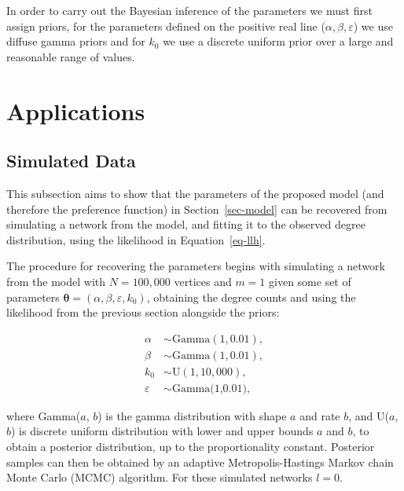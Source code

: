 \documentclass[
  sn-basic,
  10pt,
]{sn-jnl}
\theoremstyle{thmstyleone}
\theoremstyle{thmstyleone}
\theoremstyle{remark}
\theoremstyle{plain}
\theoremstyle{plain}
\theoremstyle{remark}
\begin{document}
In order to carry out the Bayesian inference of the parameters we must
first assign priors, for the parameters defined on the positive real
line (\(\alpha, \beta,\varepsilon\)) we use diffuse gamma priors and for
\(k_0\) we use a discrete uniform prior over a large and reasonable
range of values.

\section{Applications}\label{applications}

\subsection{Simulated Data}\label{sec-sim}

This subsection aims to show that the parameters of the proposed model
(and therefore the preference function) in Section~\ref{sec-model} can
be recovered from simulating a network from the model, and fitting it to
the observed degree distribution, using the likelihood in
Equation~\ref{eq-llh}.

The procedure for recovering the parameters begins with simulating a
network from the model with \(N=100,000\) vertices and \(m=1\) given
some set of parameters
\(\pmb\theta = (\alpha, \beta, \varepsilon, k_0)\), obtaining the degree
counts and using the likelihood from the previous section alongside the
priors:

\begin{align*}
\alpha&\sim \text{Gamma}(1,0.01),\\
\beta &\sim  \text{Gamma}(1,0.01),\\
k_0 &\sim \text{U}(1,10,000),\\
\varepsilon &\sim \text{Gamma(1,0.01)},
\end{align*}

where Gamma(\(a\), \(b\)) is the gamma distribution with shape \(a\) and
rate \(b\), and U(\(a\), \(b\)) is discrete uniform distribution with
lower and upper bounds \(a\) and \(b\), to obtain a posterior
distribution, up to the proportionality constant. Posterior samples can
then be obtained by an adaptive Metropolis-Hastings Markov chain Monte
Carlo (MCMC) algorithm. For these simulated networks \(l=0\).
\end{document}
